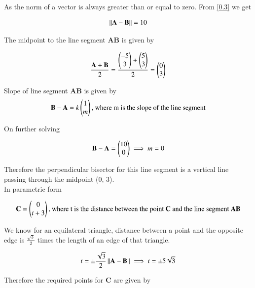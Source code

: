 \documentclass[journal]{IEEEtran}
\begin{document}
As the norm of a vector is always greater than or equal to zero. From \ref{0.3} we get

\begin{align}
    \left\lVert\textbf{A}-\textbf{B}\right\rVert = 10
    \label{0.4}
\end{align}

The midpoint to the line segment \textbf{AB} is given by

\begin{align}
        \frac{\textbf{A}+\textbf{B}}{2} = \frac{\begin{pmatrix}-5\\3\end{pmatrix}+\begin{pmatrix}5\\3\end{pmatrix}}{2} = \begin{pmatrix}0\\3\end{pmatrix}
        \label{0.5}
\end{align}

Slope of line segment \textbf{AB} is given by
\begin{align}
    \textbf{B}-\textbf{A}=k\begin{pmatrix}1\\m\end{pmatrix}\text{, where m is the slope of the line segment}
    \label{0.6}
\end{align}

On further solving

\begin{align}
    \textbf{B}-\textbf{A}=\begin{pmatrix}10\\0\end{pmatrix} \implies m=0
    \label{0.7}
\end{align}

Therefore the perpendicular bisector for this line segment is a vertical line passing through the midpoint (0, 3).\\

In parametric form

\begin{align}
    \textbf{}
    \textbf{C}= \begin{pmatrix}0\\t+3\end{pmatrix}\text{, where t is the distance between the point \textbf{C} and the line segment \textbf{AB}}
    \label{0.8}
\end{align}

We know for an equilateral triangle, distance between a point and the opposite edge is $\frac{\sqrt{3}}{2}$ times the length of an edge of that triangle.

\begin{align}
    t=\pm \frac{\sqrt{3}}{2}\left\lVert\textbf{A}-\textbf{B}\right\rVert \implies t=\pm 5\sqrt{3}
    \label{0.9}
\end{align}

Therefore the required points for \textbf{C} are given by
\end{document}
